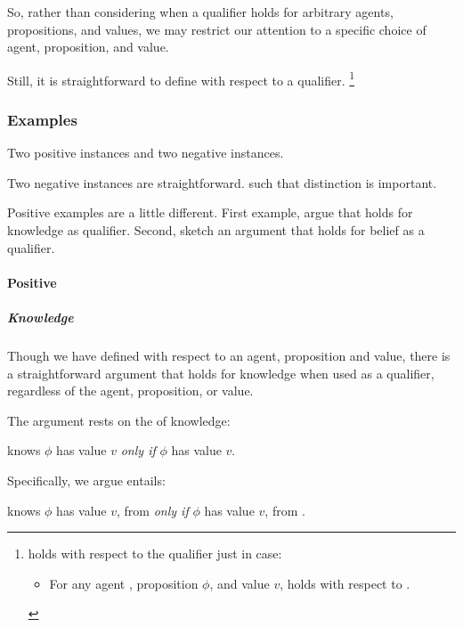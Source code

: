 \begin{note}
  So, rather than considering when a qualifier holds for arbitrary agents, propositions, and values, we may restrict our attention to a specific choice of agent, proposition, and value.

  Still, it is straightforward to define \ptivity{} with respect to a qualifier.%
  \footnote{
     holds with respect to the qualifier \ptivityQV{} just in case:
    \begin{itemize}
    \item[]
      For any agent \vAgent{}, proposition \(\phi\), and value \(v\), \ptivity{} holds with respect to \ptivityQV{}.
    \end{itemize}
  }
\end{note}


\subsubsection{Examples}
\label{cha:zSpA:sec:examples-of-ptivity-y-n}

\begin{note}
  Two positive instances and two negative instances.

  Two negative instances are straightforward.
   such that distinction is important.

  Positive examples are a little different.
  First example, argue that \ptivity{} holds for knowledge as qualifier.
  Second, sketch an argument that \ptivity{} holds for belief as a qualifier.
\end{note}

\paragraph{Positive}

\subparagraph{Knowledge}

\begin{note}[Knowledge]
  Though we have defined \ptivity{} with respect to an agent, proposition and value, there is a straightforward argument that \ptivity{} holds for knowledge when used as a qualifier, regardless of the agent, proposition, or value.

  The argument rests on the \factivity{} of knowledge:

  \begin{principle}
    \label{principle:factivity}
    \vAgent{} knows \(\phi\) has value \(v\) \emph{only if} \(\phi\) has value \(v\).
  \end{principle}

  Specifically, we argue \factivity{} entails:

  \begin{principle}
    \label{principle:factivity-perspective}
    \vAgent{} knows \(\phi\) has value \(v\), from  \emph{only if} \(\phi\) has value \(v\), from .
  \end{principle}
\end{note}

